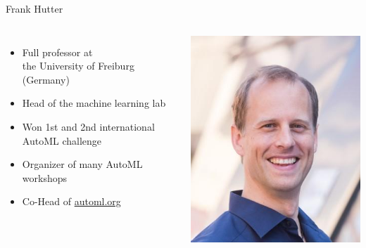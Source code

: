 \begin{frame}[c]{Frank Hutter}

\begin{columns}
	

\begin{itemize}
	\item Full professor at\\ the University of Freiburg (Germany)
	\item Head of the machine learning lab
	\item Won 1st and 2nd international AutoML challenge
	\item Organizer of many AutoML workshops 
	\item Co-Head of \url{automl.org}
\end{itemize}


\includegraphics[width=1.0\textwidth]{images/hutter.jpg}
	
\end{columns}

\end{frame}
